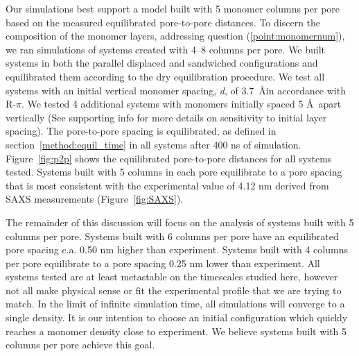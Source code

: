 \documentclass[journal=jpcbfk,manusciprt=article]{achemso}
\begin{document}
  Our simulations best support a model built with 5 monomer columns per pore based on
  the measured equilibrated pore-to-pore distances. To discern the composition of
  the monomer layers, addressing question (\ref{point:monomernum}), we ran
  simulations of systems created with 4--8 columns per pore. We built systems in both
  the parallel displaced and sandwiched configurations and equilibrated them according
  to the dry equilibration procedure. We test all systems with an initial vertical monomer 
  spacing, \textit{d}, of 3.7~\AA in accordance with R-$\pi$. We tested 4 additional systems with
  monomers initially spaced 5 \AA~apart vertically (See supporting info for more details on       
  sensitivity to initial layer spacing). The pore-to-pore spacing is equilibrated, as defined in
  section~\ref{method:equil_time} in all systems after 400 ns of simulation.
  Figure~\ref{fig:p2p} shows the equilibrated pore-to-pore distances for all systems tested. 
  Systems built with 5 columns in each pore equilibrate to a pore spacing that is most
  consistent with the experimental value of 4.12 nm derived from SAXS measurements 
  (Figure~\ref{fig:SAXS}).

  The remainder of this discussion will focus on the analysis of systems built with
  5 columns per pore. Systems built with 6 columns per pore have an equilibrated
  pore spacing c.a. 0.50 nm higher than experiment. Systems built with 4 columns per pore
  equilibrate to a pore spacing 0.25 nm lower than experiment. All systems tested are at least
  metastable on the timescales studied here, however not all make physical sense or
  fit the experimental profile that we are trying to match. In the limit of infinite simulation
  time, all simulations will converge to a single density. It is our intention to choose an
  initial configuration which quickly reaches a monomer density close to experiment. We believe
  systems built with 5 columns per pore achieve this goal.
\end{document}
